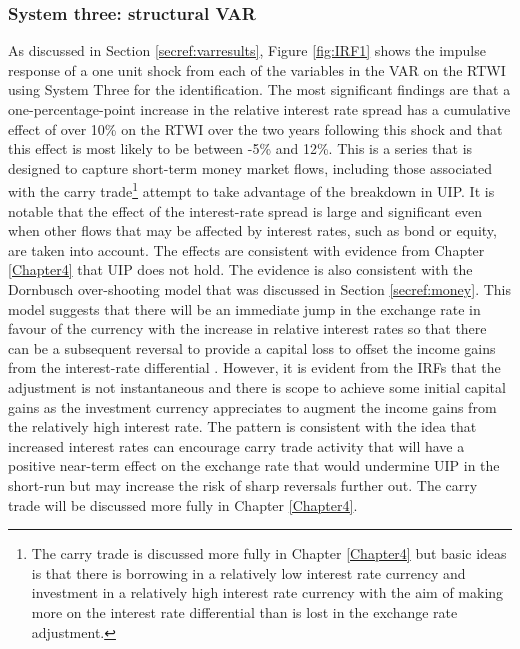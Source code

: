 \documentclass[12pt, a4paper, oneside]{article}\usepackage[]{graphicx}\usepackage[]{color}
\begin{document}
\subsubsection{System three:  structural VAR}
As discussed in Section \ref{secref:varresults}, Figure \ref{fig:IRF1} shows the impulse response of a one unit shock from each of the variables in the VAR on the RTWI using System Three for the identification.  The most significant findings are that a one-percentage-point increase in the relative interest rate spread has a cumulative effect of over 10\% on the RTWI over the two years following this shock and that this effect is most likely to be between -5\% and 12\%.  This is a series that is designed to capture short-term money market flows, including those associated with the carry trade\footnote{The carry trade is discussed more fully in Chapter \ref{Chapter4} but basic ideas is that there is borrowing in a relatively low interest rate currency and investment in a relatively high interest rate currency with the aim of making more on the interest rate differential than is lost in the exchange rate adjustment.} attempt to take advantage of the breakdown in UIP.  It is notable that the effect of the interest-rate spread is large and significant even when other flows that may be affected by interest rates, such as bond or equity, are taken into account.  The effects are consistent with evidence from Chapter \ref{Chapter4} that UIP does not hold.  The evidence is also consistent with the Dornbusch over-shooting model that was discussed in Section \ref{secref:money}.  This model suggests that there will be an immediate jump in the exchange rate in favour of the currency with the increase in relative interest rates so that there can be a subsequent reversal to provide a capital loss to offset the income gains from the interest-rate differential \citep{Dornbusch1976Expectations}.  However, it is evident from the IRFs that the adjustment is not instantaneous and there is scope to achieve some initial capital gains as the investment currency appreciates to augment the income gains from the relatively high interest rate.  The pattern is consistent with the idea that increased interest rates can encourage carry trade activity that will have a positive near-term effect on the exchange rate that would undermine UIP in the short-run but may increase the risk of sharp reversals further out.  The carry trade will be discussed more fully in Chapter \ref{Chapter4}.   
\end{document}
